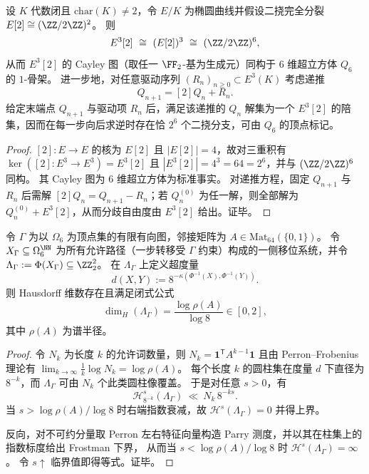 \begin{proposition}\label{prop:conclusion-elliptic-e3-2torsion-q6-branching}
设 \(K\) 代数闭且 \(\mathrm{char}(K)\neq 2\)，令 \(E/K\) 为椭圆曲线并假设二挠完全分裂 \(E[2]\cong(\ZZ/2\ZZ)^2\)。
则
\[
E^3[2]\ \cong\ (E[2])^3\ \cong\ (\ZZ/2\ZZ)^6,
\]
从而 \(E^3[2]\) 的 Cayley 图（取任一 \(\FF_2\)-基为生成元）同构于 \(6\) 维超立方体 \(Q_6\) 的 \(1\)-骨架。
进一步地，对任意驱动序列 \((R_n)_{n\ge 0}\subset E^3(K)\) 考虑递推
\[
Q_{n+1}=[2]Q_n+R_n.
\]
给定末端点 \(Q_{n+1}\) 与驱动项 \(R_n\) 后，满足该递推的 \(Q_n\) 解集为一个 \(E^3[2]\) 的陪集，因而在每一步向后求逆时存在恰 \(2^6\) 个二挠分支，可由 \(Q_6\) 的顶点标记。
\end{proposition}
\begin{proof}
\([2]:E\to E\) 的核为 \(E[2]\) 且 \(|E[2]|=4\)，故对三重积有 \(\ker([2]:E^3\to E^3)=E^3[2]\) 且 \(|E^3[2]|=4^3=64=2^6\)，并与 \((\ZZ/2\ZZ)^6\) 同构。
其 Cayley 图为 \(6\) 维超立方体为标准事实。
对递推方程，固定 \(Q_{n+1}\) 与 \(R_n\) 后需解 \([2]Q_n=Q_{n+1}-R_n\)；若 \(Q_n^{(0)}\) 为任一解，则全部解为
\(
Q_n^{(0)}+E^3[2]
\)，从而分歧自由度由 \(E^3[2]\) 给出。证毕。
\end{proof}

\begin{theorem}\label{thm:conclusion-window6-sft-2adic-dimension-spectral-radius}
令 \(\Gamma\) 为以 \(\Omega_6\) 为顶点集的有限有向图，邻接矩阵为 \(A\in\mathrm{Mat}_{64}(\{0,1\})\)。
令 \(X_\Gamma\subseteq\Omega_6^{\NN}\) 为所有允许路径（一步转移受 \(\Gamma\) 约束）构成的一侧移位系统，并令
\(
\Lambda_\Gamma:=\Phi(X_\Gamma)\subseteq \ZZ_2^2
\)。
在 \(\Lambda_\Gamma\) 上定义超度量
\[
d(X,Y):=8^{-\kappa(\Phi^{-1}(X),\Phi^{-1}(Y))}.
\]
则 Hausdorff 维数存在且满足闭式公式
\[
\dim_H(\Lambda_\Gamma)=\frac{\log\rho(A)}{\log 8}\in[0,2],
\]
其中 \(\rho(A)\) 为谱半径。
\end{theorem}

\begin{proof}
令 \(N_k\) 为长度 \(k\) 的允许词数量，则
\(
N_k=\mathbf 1^{\mathsf T}A^{k-1}\mathbf 1
\)
且由 Perron--Frobenius 理论有 \(\lim_{k\to\infty}\frac1k\log N_k=\log\rho(A)\)。
每个长度 \(k\) 的圆柱集在度量 \(d\) 下直径为 \(8^{-k}\)，而 \(\Lambda_\Gamma\) 可由 \(N_k\) 个此类圆柱像覆盖。
于是对任意 \(s>0\)，有
\[
\mathcal H^s_{8^{-k}}(\Lambda_\Gamma)\ \ll\ N_k\,8^{-ks}.
\]
当 \(s>\log\rho(A)/\log 8\) 时右端指数衰减，故 \(\mathcal H^s(\Lambda_\Gamma)=0\) 并得上界。
\par
反向，对不可约分量取 Perron 左右特征向量构造 Parry 测度，并以其在柱集上的指数标度给出 Frostman 下界，
从而当 \(s<\log\rho(A)/\log 8\) 时 \(\mathcal H^s(\Lambda_\Gamma)=\infty\)。
令 \(s\uparrow\) 临界值即得等式。证毕。
\end{proof}

